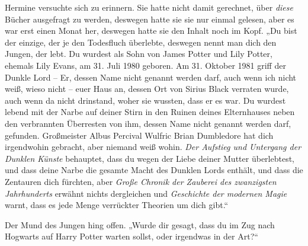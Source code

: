 Hermine versuchte sich zu erinnern. Sie hatte nicht damit gerechnet, über \emph{diese} Bücher ausgefragt zu werden, deswegen hatte sie sie nur einmal gelesen, aber es war erst einen Monat her, deswegen hatte sie den Inhalt noch im Kopf. „Du bist der einzige, der je den Todesfluch überlebte, deswegen nennt man dich den Jungen, der lebt. Du wurdest als Sohn von James Potter und Lily Potter, ehemals Lily Evans, am 31. Juli 1980 geboren. Am 31. Oktober 1981 griff der Dunkle Lord – Er, dessen Name nicht genannt werden darf, auch wenn ich nicht weiß, wieso nicht – euer Haus an, dessen Ort von Sirius Black verraten wurde, auch wenn da nicht drinstand, woher sie wussten, dass er es war. Du wurdest lebend mit der Narbe auf deiner Stirn in den Ruinen deines Elternhauses neben den verbrannten Überresten von ihm, dessen Name nicht genannt werden darf, gefunden. Großmeister Albus Percival Wulfric Brian Dumbledore hat dich irgendwohin gebracht, aber niemand weiß wohin. \emph{Der Aufstieg und Untergang der Dunklen Künste} behauptet, dass du wegen der Liebe deiner Mutter überlebtest, und dass deine Narbe die gesamte Macht des Dunklen Lords enthält, und dass die Zentauren dich fürchten, aber \emph{Große Chronik der Zauberei des zwanzigsten Jahrhunderts} erwähnt nichts dergleichen und \emph{Geschichte der modernen Magie} warnt, dass es jede Menge verrückter Theorien um dich gibt.“

Der Mund des Jungen hing offen. „Wurde dir gesagt, dass du im Zug nach Hogwarts auf Harry Potter warten sollst, oder irgendwas in der Art?“

